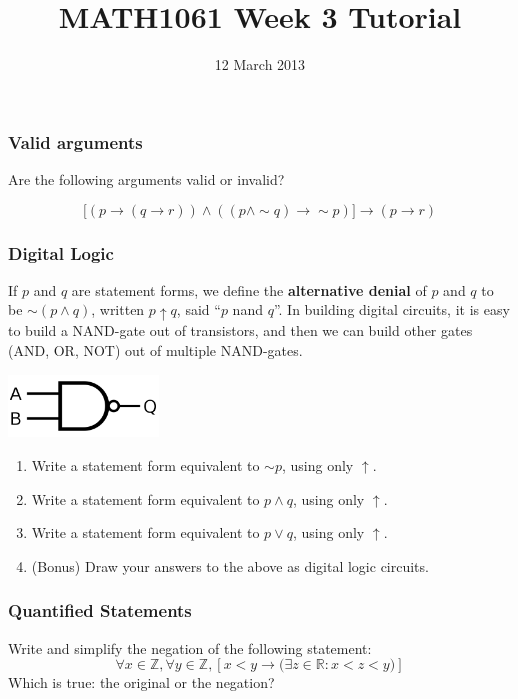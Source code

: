 \documentclass{beamer}
\title{MATH1061 Week 3 Tutorial}
\date{12 March 2013}
\newcommand{\nand}{\uparrow}
\begin{document}
\frame{\titlepage}

\begin{frame}
\frametitle{Valid arguments}
Are the following arguments valid or invalid?

\[ %
    \big[ (p \rightarrow (q \rightarrow r))
        \land ((p \land \sim q) \rightarrow \sim p)
        \big] \rightarrow (p \rightarrow r)
\]
\end{frame}

\begin{frame}
\frametitle{Digital Logic}

If $p$ and $q$ are statement forms, we define the {\bf alternative denial} of
$p$ and $q$ to be $\sim (p \land q)$, written $p \nand q$, said ``$p$ nand $q$''.
In building digital circuits, it is easy to build a NAND-gate out of transistors,
and then we can build other gates (AND, OR, NOT) out of multiple NAND-gates.

\centering
\includegraphics[width=0.3\textwidth]{src/nand.png}

\begin{enumerate}
\item Write a statement form equivalent to $\sim p$, using only $\nand$.
\item Write a statement form equivalent to $p \land q$, using only $\nand$.
\item Write a statement form equivalent to $p \lor q$, using only $\nand$.
\item (Bonus) Draw your answers to the above as digital logic circuits.
\end{enumerate}

\end{frame}

\begin{frame}
\frametitle{Quantified Statements}


Write and simplify the negation of the following statement:
\[
    \forall x \in \mathbb{Z}, \forall y \in \mathbb{Z},
    \left[ x < y \rightarrow \big( \exists z \in \mathbb{R} :
    x < z < y \big) \right]
\]
Which is true: the original or the negation?

\end{frame}
\end{document}
